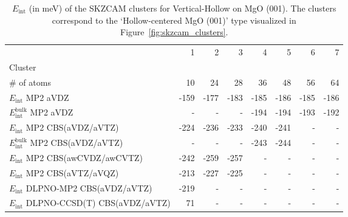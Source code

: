 \begin{table}
\caption{\label{tab:system_eint_mgo_no_vertical-hollow}$E_\textrm{int}$ (in meV) of the SKZCAM clusters for Vertical-Hollow  on MgO (001). The clusters correspond to the `Hollow-centered MgO (001)' type visualized in Figure~\ref{fig:skzcam_clusters}.}
\begin{adjustbox}{center,max width=1.4\textwidth}
\begin{tabular}{lrrrrrrr}
\toprule
 & 1 & 2 & 3 & 4 & 5 & 6 & 7 \\ 
Cluster &  &  &  &  &  &  &  \\
\midrule
\# of atoms & 10 & 24 & 28 & 36 & 48 & 56 & 64 \\
$E_\textrm{int}$ MP2 aVDZ & -159 & -177 & -183 & -185 & -186 & -185 & -186 \\
$E_\textrm{int}^\textrm{bulk}$ MP2 aVDZ & - & - & - & -194 & -194 & -193 & -192 \\
$E_\textrm{int}$ MP2 CBS(aVDZ/aVTZ) & -224 & -236 & -233 & -240 & -241 & - & - \\
$E_\textrm{int}^\textrm{bulk}$ MP2 CBS(aVDZ/aVTZ) & - & - & - & -243 & -244 & - & - \\
$E_\textrm{int}$ MP2 CBS(awCVDZ/awCVTZ) & -242 & -259 & -257 & - & - & - & - \\
$E_\textrm{int}$ MP2 CBS(aVTZ/aVQZ) & -213 & -227 & -225 & - & - & - & - \\
$E_\textrm{int}$ DLPNO-MP2 CBS(aVDZ/aVTZ) & -219 & - & - & - & - & - & - \\
$E_\textrm{int}$ DLPNO-CCSD(T) CBS(aVDZ/aVTZ) & 71 & - & - & - & - & - & - \\
\bottomrule
\end{tabular}
\end{adjustbox}
\end{table}

